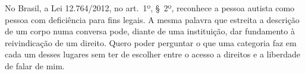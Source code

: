 No Brasil, a Lei 12.764/2012, no art.~1º, \S~2º, reconhece a pessoa autista como pessoa com deficiência para fins legais. A mesma palavra que estreita a descrição de um corpo numa conversa pode, diante de uma instituição, dar fundamento à reivindicação de um direito. Quero poder perguntar o que uma categoria faz em cada um desses lugares sem ter de escolher entre o acesso a direitos e a liberdade de falar de mim.
